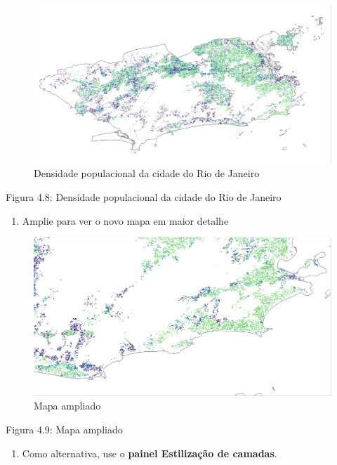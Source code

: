 \documentclass[
  portuguese,
]{krantz}
\providecommand{\tightlist}{%
  \setlength{\itemsep}{0pt}\setlength{\parskip}{0pt}}
\begin{document}
\begin{figure}
\centering
\includegraphics{media/modulo4/hrsl-style.png}
\caption{Densidade populacional da cidade do Rio de Janeiro}
\end{figure}

Figura 4.8: Densidade populacional da cidade do Rio de Janeiro

\begin{enumerate}
\def\labelenumi{\arabic{enumi}.}
\setcounter{enumi}{4}
\tightlist
\item
  Amplie para ver o novo mapa em maior detalhe
\end{enumerate}

\begin{figure}
\centering
\includegraphics{media/modulo4/zoom-in.png}
\caption{Mapa ampliado}
\end{figure}

Figura 4.9: Mapa ampliado

\begin{enumerate}
\def\labelenumi{\arabic{enumi}.}
\setcounter{enumi}{5}
\tightlist
\item
  Como alternativa, use o \textbf{painel Estilização de camadas}.
\end{enumerate}
\end{document}
